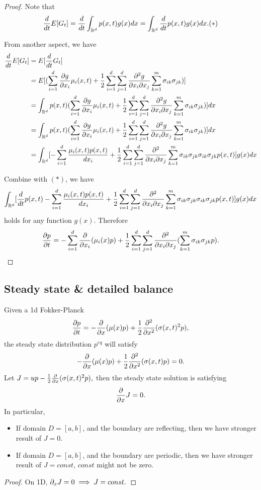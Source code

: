 \begin{refsection}
\begin{proof}
Note that
$$\frac{d}{dt} E[G_t] = \frac{d}{dt}\int_{\mathbb{R}^d} p(x,t)g(x)dx = \int_{\mathbb{R}^d} \frac{d}{dt}p(x,t) g(x)dx.(*)$$

From another aspect, we have
\begin{align*}
\frac{d}{dt}E[G_t] &= E[\frac{d}{dt}G_t] \\
&=E[(\sum_{i=1}^{d} \frac{\partial g}{\partial x_i} \mu_i(x,t) + \frac{1}{2}\sum_{i=1}^{d}\sum_{j=1}^{d}\frac{\partial^2 g}{\partial x_i\partial x_j} \sum_{k=1}^m \sigma_{ik}\sigma_{jk})] \\
&=\int_{\mathbb{R}^d}p(x,t)(\sum_{i=1}^{d} \frac{\partial g}{\partial x_i} \mu_i(x,t) + \frac{1}{2}\sum_{i=1}^{d}\sum_{j=1}^{d}\frac{\partial^2 g}{\partial x_i\partial x_j} \sum_{k=1}^m \sigma_{ik}\sigma_{jk})]dx \\
&=\int_{\mathbb{R}^d}p(x,t)(\sum_{i=1}^{d} \frac{\partial g}{\partial x_i} \mu_i(x,t) + \frac{1}{2}\sum_{i=1}^{d}\sum_{j=1}^{d}\frac{\partial^2 g}{\partial x_i\partial x_j} \sum_{k=1}^m \sigma_{ik}\sigma_{jk})]dx \\
&=\int_{\mathbb{R}^d} [-\sum_{i=1}^{d}\frac{\mu_i(x,t)p(x,t)}{dx_i} + \frac{1}{2} \sum_{i=1}^{d}\sum_{j=1}^{d} \frac{\partial^2}{\partial x_i\partial x_j} \sum_{k=1}^m \sigma_{ik}\sigma_{jk} \sigma_{ik}\sigma_{jk} p(x,t) ] g(x)dx \\
\end{align*}

Combine with $(*)$, we have
$$\int_{\mathbb{R}^d}[\frac{d}{dt}p(x,t)-\sum_{i=1}^{d}\frac{\mu_i(x,t)p(x,t)}{dx_i} + \frac{1}{2} \sum_{i=1}^{d}\sum_{j=1}^{d} \frac{\partial^2}{\partial x_i\partial x_j} \sum_{k=1}^m \sigma_{ik}\sigma_{jk} \sigma_{ik}\sigma_{jk} p(x,t) ] g(x)dx $$
holds for any function $g(x)$. Therefore
	$$\frac{\partial p}{\partial t} = -\sum_{i=1}^d \frac{\partial}{\partial x_i}(\mu_i(x) p)  + \frac{1}{2}\sum_{i=1}^d\sum_{j=1}^d \frac{\partial^2}{\partial x_i\partial x_j}(\sum_{k=1}^m \sigma_{ik}\sigma_{jk}p).$$
\end{proof}




\subsection{Steady state \& detailed balance}
\begin{lemma}
Given a 1d Fokker-Planck 	$$\frac{\partial p}{\partial t} = -\frac{\partial}{\partial x}(\mu(x)p)  + \frac{1}{2}\frac{\partial^2}{\partial x^2}(\sigma(x,t)^2p),$$
the steady state distribution $p^{eq}$ will satisfy 
$$-\frac{\partial}{\partial x}(\mu(x)p)  + \frac{1}{2}\frac{\partial^2}{\partial x^2}(\sigma(x,t)p) =0.$$
Let $J = up - \frac{1}{2}\frac{\partial}{\partial x}(\sigma(x,t)^2p), $ then the steady state solution is satisfying 
$$\frac{\partial}{\partial x} J = 0.$$
In particular, 
\begin{itemize}
	\item If domain $D = [a,b]$, and the boundary are reflecting, then
	we have stronger result of $J = 0$.
	\item If domain $D = [a,b]$, and the boundary are periodic, then
we have stronger result of $J = const $, $const$ might not be zero.
\end{itemize}
\end{lemma}
\begin{proof}
On 1D, $\partial_x J = 0 \implies J = const.$
\end{proof}



\end{refsection}
